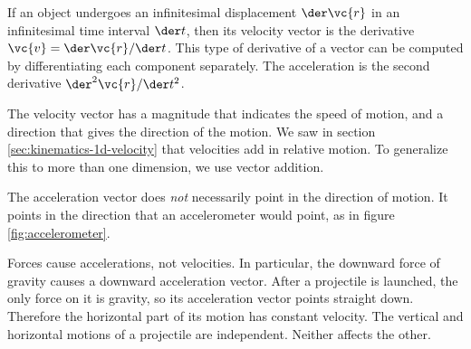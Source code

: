 If an object undergoes an infinitesimal displacement $\der\vc{r}$ in an
infinitesimal time interval $\der t$, then its velocity vector is the derivative
$\vc{v}=\der\vc{r}/\der t$. This type of derivative of a vector can be computed
by differentiating each component separately. The acceleration is the
second derivative $\der^2\vc{r}/\der t^2$.


The velocity vector has a magnitude that indicates the speed of motion, and
a direction that gives the direction of the motion. We saw in section
\ref{sec:kinematics-1d-velocity} that velocities add in relative motion.
To generalize this to more than one dimension, we use vector addition.

The acceleration vector does \emph{not} necessarily point in the direction
of motion. It points in the direction that an accelerometer would point,
as in figure \ref{fig:accelerometer}.


Forces cause accelerations, not velocities. In particular, the downward force of gravity
causes a downward acceleration vector. After a projectile is launched, the only force
on it is gravity, so its acceleration vector points straight down. Therefore the horizontal
part of its motion has constant velocity. The vertical and horizontal motions of a projectile
are independent. Neither affects the other.
